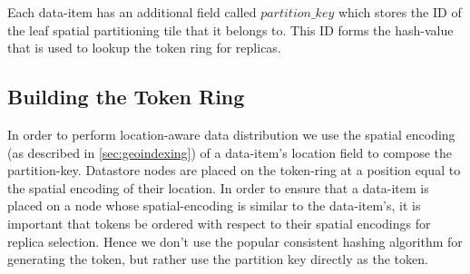 \par Each data-item has an additional field called $partition\_key$ which stores the ID of the leaf spatial partitioning tile that it belongs to. This ID forms the hash-value that is used to lookup the token ring for replicas. 

\subsection{Building the Token Ring}
\par In order to perform location-aware data distribution we use the spatial encoding (as described in \cref{sec:geoindexing}) of a data-item's location field to compose the partition-key. Datastore nodes are placed on the token-ring at a position equal to the spatial encoding of their location. In order to ensure that a data-item is placed on a node whose spatial-encoding is similar to the data-item's, it is important that tokens be ordered with respect to their spatial encodings for replica selection. Hence we don't use the popular consistent hashing algorithm for generating the token, but rather use the partition key directly as the token. 

